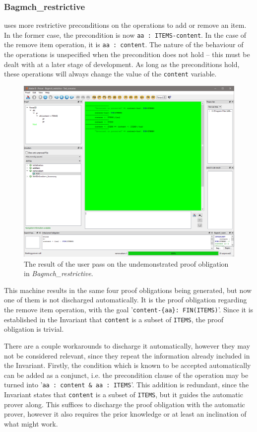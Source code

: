 \documentclass[12pt,journal,duplex]{IEEEtran}
\begin{document}
	\subsubsection{Bagmch\_restrictive} uses more restrictive preconditions on the operations to add or remove an item. In the former case, the precondition is now \texttt{aa : ITEMS-content}. In the case of the remove item operation, it is \texttt{aa : content}. The nature of the behaviour of the operations is unspecified when the precondition does not hold -- this must be dealt with at a later stage of development. As long as the preconditions hold, these operations will always change the value of the \texttt{content} variable.
		\begin{figure}
		\centering
		\includegraphics[scale=0.5]{bagmch_restrictive_ip.png}
		\caption{The result of the user pass on the undemonstrated proof obligation in  \emph{Bagmch\_restrictive}.}

	\end{figure}
	This machine results in the same four proof obligations being generated, but now one of them is not discharged automatically. It is the proof obligation regarding the remove item operation, with the goal '\texttt{content-\{aa\}: FIN(ITEMS)}'. Since it is established in the Invariant that \texttt{content} is a subset of \texttt{ITEMS}, the proof obligation is trivial.

	There are a couple workarounds to discharge it automatically, however they may not be considered relevant, since they repeat the information already included in the Invariant. Firstly, the condition which is known to be accepted automatically can be added as a conjunct, i.e. the precondition clause of the operation may be turned into '\texttt{aa : content \& aa : ITEMS}'. This addition is redundant, since the Invariant states that \texttt{content} is a subset of \texttt{ITEMS}, but it guides the automatic prover along. This suffices to discharge the proof obligation with the automatic prover, however it also requires the prior knowledge or at least an inclination of what might work.
\end{document}
